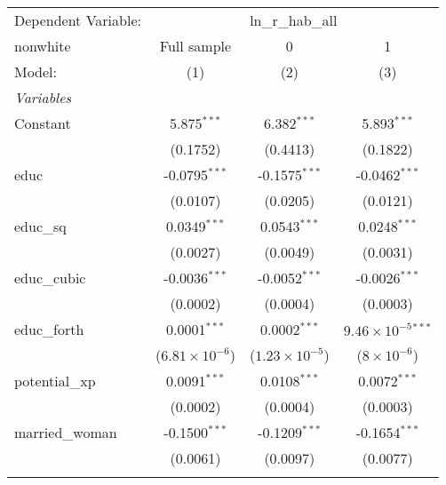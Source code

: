 
\begingroup
\centering
\begin{tabular}{lccc}
   \tabularnewline \midrule \midrule
   Dependent Variable: & \multicolumn{3}{c}{ln\_r\_hab\_all}\\
   nonwhite                        & Full sample             & 0                       & 1 \\   
   Model:                          & (1)                     & (2)                     & (3)\\  
   \midrule
   \emph{Variables}\\
   Constant                        & 5.875$^{***}$           & 6.382$^{***}$           & 5.893$^{***}$\\   
                                   & (0.1752)                & (0.4413)                & (0.1822)\\   
   educ                            & -0.0795$^{***}$         & -0.1575$^{***}$         & -0.0462$^{***}$\\   
                                   & (0.0107)                & (0.0205)                & (0.0121)\\   
   educ\_sq                        & 0.0349$^{***}$          & 0.0543$^{***}$          & 0.0248$^{***}$\\   
                                   & (0.0027)                & (0.0049)                & (0.0031)\\   
   educ\_cubic                     & -0.0036$^{***}$         & -0.0052$^{***}$         & -0.0026$^{***}$\\   
                                   & (0.0002)                & (0.0004)                & (0.0003)\\   
   educ\_forth                     & 0.0001$^{***}$          & 0.0002$^{***}$          & $9.46\times 10^{-5}$$^{***}$\\    
                                   & ($6.81\times 10^{-6}$)  & ($1.23\times 10^{-5}$)  & ($8\times 10^{-6}$)\\    
   potential\_xp                   & 0.0091$^{***}$          & 0.0108$^{***}$          & 0.0072$^{***}$\\   
                                   & (0.0002)                & (0.0004)                & (0.0003)\\   
   married\_woman                  & -0.1500$^{***}$         & -0.1209$^{***}$         & -0.1654$^{***}$\\   
                                   & (0.0061)                & (0.0097)                & (0.0077)\\   
$$
\end{tabular}
